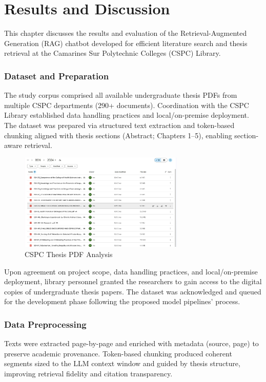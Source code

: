 \chapter{Results and Discussion}
\begin{refsection}

This chapter discusses the results and evaluation of the Retrieval-Augmented Generation (RAG) chatbot developed for efficient literature search and thesis retrieval at the Camarines Sur Polytechnic Colleges (CSPC) Library.

\subsection{Dataset and Preparation}
The study corpus comprised all available undergraduate thesis PDFs from multiple CSPC departments (290+ documents). Coordination with the CSPC Library established data handling practices and local/on-premise deployment. The dataset was prepared via structured text extraction and token-based chunking aligned with thesis sections (Abstract; Chapters 1--5), enabling section-aware retrieval.


\begin{figure}[h]
    \centering
    \includegraphics[width=0.7\textwidth]{figures/dataset_sample.jpg}
    \caption{CSPC Thesis PDF Analysis}
\end{figure}

Upon agreement on project scope, data handling practices, and local/on-premise deployment, library personnel granted the researchers to gain access to the digital copies of undergraduate thesis papers. The dataset was acknowledged and queued for the development phase following the proposed model pipelines’ process.

\subsection{Data Preprocessing}
Texts were extracted page-by-page and enriched with metadata (source, page) to preserve academic provenance. Token-based chunking produced coherent segments sized to the LLM context window and guided by thesis structure, improving retrieval fidelity and citation transparency.


\end{refsection}
